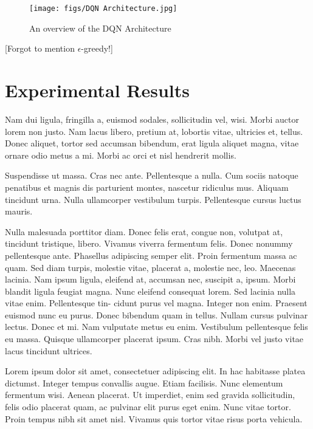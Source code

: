 \documentclass{article}
\begin{document}
\begin{figure}[!htb]
\centering
\texttt{[image: figs/DQN Architecture.jpg]}
  \caption{An overview of the DQN Architecture}\label{fig: DQN}
\end{figure}

{\color{red}[Forgot to mention $\epsilon$-greedy!]}

\section{Experimental Results}
\label{sec:result}
	Nam dui ligula, fringilla a, euismod sodales, sollicitudin vel, wisi. Morbi auctor lorem non justo.
	Nam lacus libero, pretium at, lobortis vitae, ultricies et, tellus. Donec aliquet, tortor sed accumsan
	bibendum, erat ligula aliquet magna, vitae ornare odio metus a mi. Morbi ac orci et nisl hendrerit
	mollis. 

	Suspendisse ut massa. Cras nec ante. Pellentesque a nulla. Cum sociis natoque penatibus
	et magnis dis parturient montes, nascetur ridiculus mus. Aliquam tincidunt urna. Nulla ullamcorper
	vestibulum turpis. Pellentesque cursus luctus mauris.
	
	Nulla malesuada porttitor diam. Donec felis erat, congue non, volutpat at, tincidunt tristique, libero.
	Vivamus viverra fermentum felis. Donec nonummy pellentesque ante. Phasellus adipiscing semper 	elit. 
	Proin fermentum massa ac quam. Sed diam turpis, molestie vitae, placerat a, molestie nec, leo.
	Maecenas lacinia. Nam ipsum ligula, eleifend at, accumsan nec, suscipit a, ipsum. Morbi blandit
	ligula feugiat magna. Nunc eleifend consequat lorem. Sed lacinia nulla vitae enim. Pellentesque tin-
	cidunt purus vel magna. Integer non enim. Praesent euismod nunc eu purus. Donec bibendum quam
	in tellus. Nullam cursus pulvinar lectus. Donec et mi. Nam vulputate metus eu enim. Vestibulum
	pellentesque felis eu massa.
	Quisque ullamcorper placerat ipsum. Cras nibh. Morbi vel justo vitae lacus tincidunt ultrices. 
	
	Lorem
	ipsum dolor sit amet, consectetuer adipiscing elit. In hac habitasse platea dictumst. Integer tempus
	convallis augue. Etiam facilisis. Nunc elementum fermentum wisi. Aenean placerat. Ut imperdiet,
	enim sed gravida sollicitudin, felis odio placerat quam, ac pulvinar elit purus eget enim. Nunc vitae
	tortor. Proin tempus nibh sit amet nisl. Vivamus quis tortor vitae risus porta vehicula.

\end{document}

